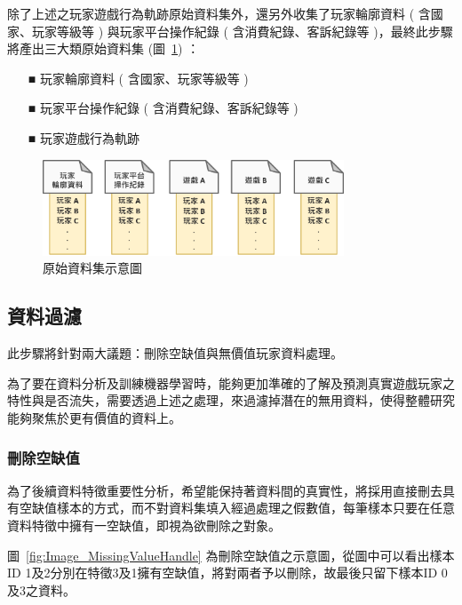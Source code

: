 除了上述之玩家遊戲行為軌跡原始資料集外，還另外收集了玩家輪廓資料 ( 含國家、玩家等級等 ) 與玩家平台操作紀錄 ( 含消費紀錄、客訴紀錄等 )，最終此步驟將產出三大類原始資料集 (圖~\ref{fig:Image_OriginalDatasets}) ：

\begin{itemize}
  \item[■] 玩家輪廓資料 ( 含國家、玩家等級等 )
  \item[■] 玩家平台操作紀錄 ( 含消費紀錄、客訴紀錄等 )
  \item[■] 玩家遊戲行為軌跡
\end{itemize} 

\begin{figure}[!htb]
  \begin{center}
    \includegraphics[width=0.8\textwidth]{figures/Image_OriginalDatasets.png}
    \caption[原始資料集示意圖]{原始資料集示意圖}
    \label{fig:Image_OriginalDatasets}
  \end{center}
\end{figure}

\subsection{資料過濾}
\label{subsec:DataFilter}

此步驟將針對兩大議題：刪除空缺值與無價值玩家資料處理。

為了要在資料分析及訓練機器學習時，能夠更加準確的了解及預測真實遊戲玩家之特性與是否流失，需要透過上述之處理，來過濾掉潛在的無用資料，使得整體研究能夠聚焦於更有價值的資料上。

\subsubsection{刪除空缺值}
\label{subsubsec:MissingValueHandle}

為了後續資料特徵重要性分析，希望能保持著資料間的真實性，將採用直接刪去具有空缺值樣本的方式，而不對資料集填入經過處理之假數值，每筆樣本只要在任意資料特徵中擁有一空缺值，即視為欲刪除之對象。

圖~\ref{fig:Image_MissingValueHandle} 為刪除空缺值之示意圖，從圖中可以看出樣本ID 1及2分別在特徵3及1擁有空缺值，將對兩者予以刪除，故最後只留下樣本ID 0及3之資料。

